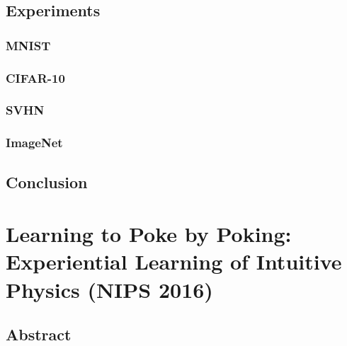 \documentclass{article}
\begin{document}
    \subsection{Experiments}\label{subsec:Improved_Techniques_for_Training_GANs:experiments}

    \subsubsection{MNIST}\label{subsubsec:Improved_Techniques_for_Training_GANs:mnist}

    \subsubsection{CIFAR-10}\label{subsubsec:Improved_Techniques_for_Training_GANs:cifar-10}

    \subsubsection{SVHN}\label{subsubsec:Improved_Techniques_for_Training_GANs:svhn}

    \subsubsection{ImageNet}\label{subsubsec:Improved_Techniques_for_Training_GANs:imagenet}

    \subsection{Conclusion}\label{subsec:Improved_Techniques_for_Training_GANs:conclusion}
    \newpage


    \section{Learning to Poke by Poking: Experiential Learning of Intuitive Physics (NIPS 2016)}\label{sec:Learning_to_Poke_by_Poking_Experiential_Learning_of_Intuitive_Physics_(NIPS_2016)}
    \subsection*{Abstract}
\end{document}
